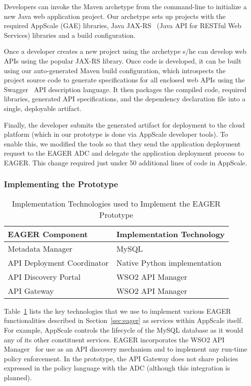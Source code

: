 Developers can invoke the Maven archetype from the command-line to initialize
a new Java web application project. Our archetype sets up projects with the
required AppScale (GAE) libraries, Java JAX-RS~\cite{jaxrs} (Java API for RESTful Web
Services) libraries and a build configuration.

Once a developer creates a new project using the archetype s/he can develop
web APIs using the popular JAX-RS library. Once code is developed, it can be built
using our auto-generated Maven build configuration, which introspects the
project source code to generate specifications for all enclosed web APIs using
the Swagger~\cite{swagger} API description language. 
It then packages the compiled
code, required libraries, generated API specifications, and the dependency
declaration file into a single, deployable artifact.

Finally, the developer submits the generated artifact for deployment to the
cloud platform (which in our prototype is done via AppScale developer tools). 
To enable this, we modified the tools so that they
send the application deployment request to the EAGER ADC and
delegate the application deployment process to EAGER. This change required
just under 50 additional lines of code in AppScale.

\subsubsection{Implementing the Prototype}

\begin{table}[t]
\begin{center}
\begin{tabular}{| p{6cm} | p{7cm} |}
\hline
EAGER Component & Implementation Technology\\ \hline
Metadata Manager & MySQL\\
API Deployment Coordinator & Native Python implementation\\
API Discovery Portal & WSO2 API Manager~\cite{wso2apimgr}\\
API Gateway & WSO2 API Manager\\
\hline
\end{tabular}
\end{center}
\caption{Implementation Technologies used to Implement the EAGER Prototype}
\label{tab:imp-tech}
\end{table}

Table~\ref{tab:imp-tech} lists the key technologies that we use to implement 
various EAGER functionalities described in
Section~\ref{sec:eager} as services within AppScale itself.  For example, AppScale
controls the lifecycle of the MySQL database as it would any of its other
constituent services.  EAGER incorporates the WSO2 API Manager~\cite{wso2am} for
use as an API discovery mechanism and to implement any run-time policy 
enforcement.  In the prototype, the API Gateway does not share policies
expressed in the policy language with the ADC (although this integration is
planned).

